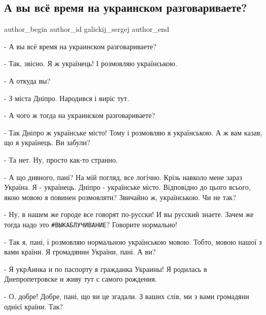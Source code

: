  
 
 
 
 
 
\subsection{А вы всё время на украинском разговариваете?}
\label{sec:30_03_2021.fb.galickij_sergej.1.mova_marshrutka_dnepropetrovsk}
 
\ifcmt
 author_begin
   author_id galickij_sergej
 author_end
\fi

- А вы всё время на украинском разговариваете?

- Так, звісно. Я ж українець! І розмовляю українською.

- А откуда вы?

- З міста Дніпро. Народився і виріс тут.

- А чого ж тогда на украинском разговариваете?

- Так Дніпро ж українське місто! Тому і розмовляю я українською. А ж вам казав,
що я українець. Ви забули?

- Та нет. Ну, просто как-то странно. 

- А що дивного, пані? На мій погляд, все логічно. Крізь навколо мене зараз
Україна. Я - українець. Дніпро - українське місто. Відповідно до цього всього,
якою мовою я повинен розмовляти? Звичайно ж, українською. Чи не так?

- Ну, в нашем же городе все говорят по-русски! И вы русский знаете. Зачем же
тогда надо это \verb|#ВЫКАБЛУЧИВАНИЕ|? Говорите нормально!

- Так я, пані, і розмовляю нормальною українською мовою. Тобто, мовою нашої з
вами країни. Я громадянин України, пані. А ви?

- Я укрАинка и по паспорту я гражданка Украины! Я родилась в Днепропетровске и
живу тут с самого рождения.

- О, добре! Добре, пані, що ви це згадали. З ваших слів, ми з вами громадяни
однієї країни. Так?

